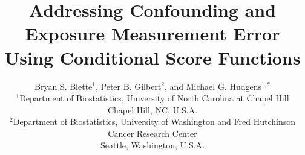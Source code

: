 \documentclass[useAMS,usenatbib,referee]{biom}
\title[Addressing Confounding and Measurement Error]{Addressing Confounding and Exposure Measurement Error Using Conditional Score Functions}
\author{Bryan S. Blette$^{1}$, Peter B. Gilbert$^{2}$, and Michael G. Hudgens$^{1,*}$\email{mhudgens@email.unc.edu} \\ $^{1}$Department of Biostatistics, University of North Carolina at Chapel Hill
\\ Chapel Hill, NC, U.S.A. \\
$^{2}$Department of Biostatistics, University of Washington and Fred Hutchinson Cancer Research Center
\\ Seattle, Washington, U.S.A.}
\begin{document}










\label{firstpage}

\end{document}
